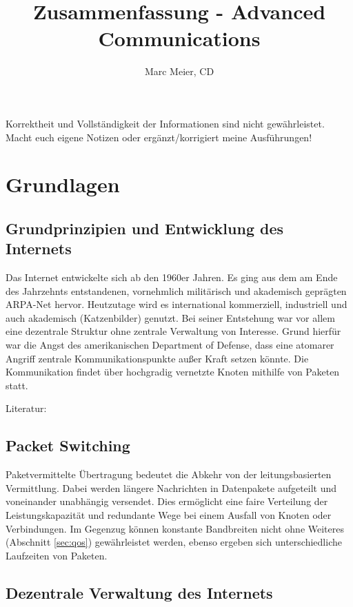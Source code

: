 \documentclass{article} %
\title{Zusammenfassung - Advanced Communications}
\author{
	Marc Meier, CD
}
\begin{document}
\maketitle
\begin{framed}Korrektheit und Vollständigkeit der Informationen sind nicht gewährleistet.
Macht euch eigene Notizen oder ergänzt/korrigiert meine Ausführungen!
\end{framed}
\setcounter{tocdepth}{1}
\tableofcontents
\newpage

\section{Grundlagen}

\subsection{Grundprinzipien und Entwicklung des Internets}
Das Internet entwickelte sich ab den 1960er Jahren.
Es ging aus dem am Ende des Jahrzehnts entstandenen, vornehmlich militärisch und akademisch geprägten ARPA-Net hervor.
Heutzutage wird es international kommerziell, industriell und auch akademisch (Katzenbilder) genutzt.
Bei seiner Entstehung war vor allem eine dezentrale Struktur ohne zentrale Verwaltung von Interesse.
Grund hierfür war die Angst des amerikanischen Department of Defense, dass eine atomarer Angriff zentrale Kommunikationspunkte außer Kraft setzen könnte.
Die Kommunikation findet über hochgradig vernetzte Knoten mithilfe von Paketen statt.

Literatur: \cite{abbate2000inventing, baran1964distributed}
\subsection{Packet Switching}
Paketvermittelte Übertragung bedeutet die Abkehr von der leitungsbasierten Vermittlung.
Dabei werden längere Nachrichten in Datenpakete aufgeteilt und voneinander unabhängig versendet.
Dies ermöglicht eine faire Verteilung der Leistungskapazität und redundante Wege bei einem Ausfall von Knoten oder Verbindungen.
Im Gegenzug können konstante Bandbreiten nicht ohne Weiteres (Abschnitt \ref{sec:qos}) gewährleistet werden, ebenso ergeben sich unterschiedliche Laufzeiten von Paketen.

\subsection{Dezentrale Verwaltung des Internets}
\end{document}
